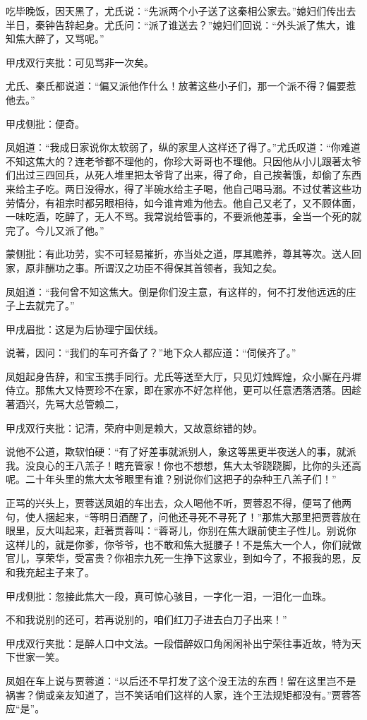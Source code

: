 \begin{parag}
    吃毕晚饭，因天黑了，尤氏说：“先派两个小子送了这秦相公家去。”媳妇们传出去半日，秦钟告辞起身。尤氏问：“派了谁送去？”媳妇们回说：“外头派了焦大，谁知焦大醉了，又骂呢。”\begin{note}甲戌双行夹批：可见骂非一次矣。\end{note}尤氏、秦氏都说道：“偏又派他作什么！放著这些小子们，那一个派不得？偏要惹他去。”\begin{note}甲戌侧批：便奇。\end{note}凤姐道：“我成日家说你太软弱了，纵的家里人这样还了得了。”尤氏叹道：“你难道不知这焦大的？连老爷都不理他的，你珍大哥哥也不理他。只因他从小儿跟著太爷们出过三四回兵，从死人堆里把太爷背了出来，得了命，自己挨著饿，却偷了东西来给主子吃。两日没得水，得了半碗水给主子喝，他自己喝马溺。不过仗著这些功劳情分，有祖宗时都另眼相待，如今谁肯难为他去。他自己又老了，又不顾体面，一味吃酒，吃醉了，无人不骂。我常说给管事的，不要派他差事，全当一个死的就完了。今儿又派了他。”\begin{note}蒙侧批：有此功劳，实不可轻易摧折，亦当处之道，厚其赡养，尊其等次。送人回家，原非酬功之事。所谓汉之功臣不得保其首领者，我知之矣。\end{note}凤姐道：“我何曾不知这焦大。倒是你们没主意，有这样的，何不打发他远远的庄子上去就完了。”\begin{note}甲戌眉批：这是为后协理宁国伏线。\end{note}说著，因问：“我们的车可齐备了？”地下众人都应道：“伺候齐了。”
\end{parag}


\begin{parag}
    凤姐起身告辞，和宝玉携手同行。尤氏等送至大厅，只见灯烛辉煌，众小厮在丹墀侍立。那焦大又恃贾珍不在家，即在家亦不好怎样他，更可以任意洒落洒落。因趁著酒兴，先骂大总管赖二，\begin{note}甲戌双行夹批：记清，荣府中则是赖大，又故意综错的妙。\end{note}说他不公道，欺软怕硬：“有了好差事就派别人，象这等黑更半夜送人的事，就派我。没良心的王八羔子！瞎充管家！你也不想想，焦大太爷跷跷脚，比你的头还高呢。二十年头里的焦大太爷眼里有谁？别说你们这把子的杂种王八羔子们！”
\end{parag}


\begin{parag}
    正骂的兴头上，贾蓉送凤姐的车出去，众人喝他不听，贾蓉忍不得，便骂了他两句，使人捆起来，“等明日酒醒了，问他还寻死不寻死了！”那焦大那里把贾蓉放在眼里，反大叫起来，赶著贾蓉叫：“蓉哥儿，你别在焦大跟前使主子性儿。别说你这样儿的，就是你爹，你爷爷，也不敢和焦大挺腰子！不是焦大一个人，你们就做官儿，享荣华，受富贵？你祖宗九死一生挣下这家业，到如今了，不报我的恩，反和我充起主子来了。\begin{note}甲戌侧批：忽接此焦大一段，真可惊心骇目，一字化一泪，一泪化一血珠。\end{note}不和我说别的还可，若再说别的，咱们红刀子进去白刀子出来！”\begin{note}甲戌双行夹批：是醉人口中文法。一段借醉奴口角闲闲补出宁荣往事近故，特为天下世家一笑。\end{note}凤姐在车上说与贾蓉道：“以后还不早打发了这个没王法的东西！留在这里岂不是祸害？倘或亲友知道了，岂不笑话咱们这样的人家，连个王法规矩都没有。”贾蓉答应“是”。
\end{parag}



